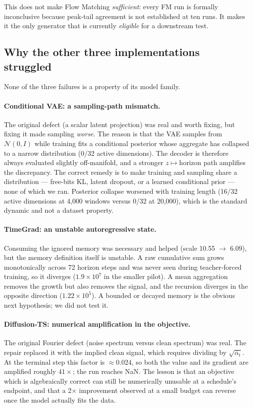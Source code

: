 This does not make Flow Matching \emph{sufficient}: every FM run is formally
inconclusive because peak-tail agreement is not established at ten runs. It
makes it the only generator that is currently \emph{eligible} for a downstream
test.

\subsection{Why the other three implementations struggled}
\label{subsec:why-others}

None of the three failures is a property of its model family.

\paragraph{Conditional VAE: a sampling-path mismatch.}
The original defect (a scalar latent projection) was real and worth fixing, but
fixing it made sampling \emph{worse}. The reason is that the VAE samples from
$\mathcal{N}(0,I)$ while training fits a conditional posterior whose aggregate
has collapsed to a narrow distribution (0/32 active dimensions). The decoder is
therefore always evaluated slightly off-manifold, and a stronger
$z\mapsto$horizon path amplifies the discrepancy. The correct remedy is to make
training and sampling share a distribution --- free-bits KL, latent dropout, or a
learned conditional prior --- none of which we ran. Posterior collapse worsened
with training length (16/32 active dimensions at 4,000 windows versus 0/32 at
20,000), which is the standard dynamic and not a dataset property.

\paragraph{TimeGrad: an unstable autoregressive state.}
Consuming the ignored memory was necessary and helped (scale 10.55 $\rightarrow$
6.09), but the memory definition itself is unstable. A raw cumulative sum grows
monotonically across 72 horizon steps and was never seen during teacher-forced
training, so it diverges ($1.9\times10^{7}$ in the smaller pilot). A mean
aggregation removes the growth but also removes the signal, and the recursion
diverges in the opposite direction ($1.22\times10^{5}$). A bounded or decayed
memory is the obvious next hypothesis; we did not test it.

\paragraph{Diffusion-TS: numerical amplification in the objective.}
The original Fourier defect (noise spectrum versus clean spectrum) was real. The
repair replaced it with the implied clean signal, which requires dividing by
$\sqrt{\bar\alpha_t}$. At the terminal step this factor is $\approx0.024$, so
both the value and its gradient are amplified roughly $41\times$; the run reaches
NaN. The lesson is that an objective which is algebraically correct can still be
numerically unusable at a schedule's endpoint, and that a 2$\times$ improvement
observed at a small budget can reverse once the model actually fits the data.

